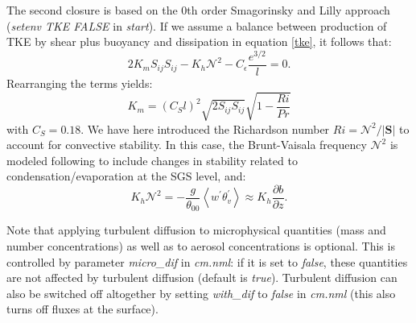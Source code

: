 \documentclass[12pt,A4,french]{article}
\begin{document}
The second closure is based on the 0th order Smagorinsky and Lilly approach \cite{Smago} ({\it setenv TKE FALSE} in {\it start}). If we assume a balance between production of TKE by shear plus buoyancy and dissipation in equation \ref{tke}, it follows that:
\begin{equation}
2K_{m}S_{ij}S_{ij} - K_{h} \mathcal{N}^{2} - C_{\epsilon} \frac{e^{3/2}}{l} = 0. 
\end{equation}
Rearranging the terms yields:
\begin{equation}
K_{m} = \left(C_{S}l\right)^{2} \sqrt{2S_{ij}S_{ij}}\sqrt{1 - \frac{Ri}{Pr}}
\end{equation}
with $C_S = 0.18$. We have here introduced the Richardson number $Ri = \mathcal{N}^{2}/\left|{\mathbf S}\right|$ to account for convective stability. In this case, the Brunt-Vaisala frequency $\mathcal{N}^{2}$ is modeled following \cite{Sal2002} to include changes in stability related to condensation/evaporation at the SGS level, and:
\begin{equation}
K_{h}\mathcal{N}^{2} = -\frac{g}{\theta_{00}}\left<w^{\prime}\theta_{v}^{\prime}\right> \approx K_{h}\frac{\partial b}{\partial z}.
\end{equation}


Note that applying turbulent diffusion to microphysical quantities (mass and number concentrations) as well as to aerosol concentrations is optional. This is controlled by parameter {\it micro\_dif} in {\it cm.nml}: if it is set to {\it false}, these quantities are not affected by turbulent diffusion (default is {\it true}). Turbulent diffusion can also be switched off altogether by setting {\it with\_dif} to {\it false} in {\it cm.nml} (this also turns off fluxes at the surface).
\end{document}
